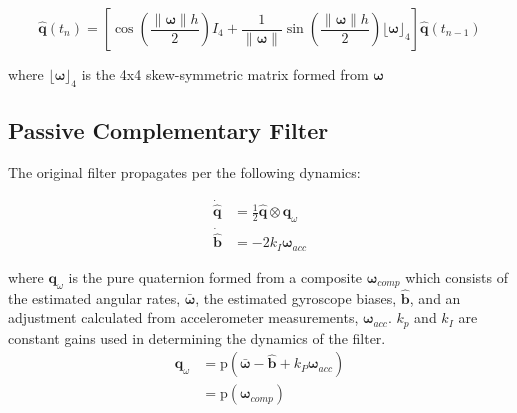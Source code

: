 \documentclass[paper=a4, fontsize=11pt]{scrartcl} %
\numberwithin{equation}{section} %
\numberwithin{figure}{section} %
\numberwithin{table}{section} %
\begin{document}
\newcommand{\norm}[1]{\left\lVert#1\right\rVert}
\newcommand{\wbar}{\bm{\bar{\omega}}}
\newcommand{\w}{\bm{\omega}}
\newcommand{\qhat}{\hat{\bm{q}}}
\begin{equation}
	\qhat(t_n) = \left[ \cos \left( \frac{\norm{\w}h}{2}\right)I_4  + \frac{1}{\norm{\w}} \sin \left( \frac{\norm{\w}h}{2} \right) \lfloor\w\rfloor_4   \right] \qhat(t_{n-1})
	\label{eq:mat_exponential}
\end{equation}

where $\lfloor\w\rfloor_4$ is the 4x4 skew-symmetric matrix formed from $\w$

\subsection{Passive Complementary Filter}
The original filter propagates per the following dynamics:

\newcommand{\wacc}{\bm{\omega}_{acc}}
\begin{equation}
	\begin{aligned}
	\bm{\dot{\hat{q}}} &= \frac{1}{2} \bm{\hat{q}} \otimes \bm{q}_{\omega}\\
	\bm{\dot{\hat{b}}} &= -2k_I\wacc
	\end{aligned}
	\label{eq:traditional_prop}
\end{equation}


where $\bm{q}_{\omega}$ is the pure quaternion formed from a composite $\bm{\omega}_{comp}$ which consists of the estimated angular rates, $\bar{\bm{\omega}}$, the estimated gyroscope biases, $\hat{\bm{b}}$, and an adjustment calculated from accelerometer measurements, $\bm{\omega}_{acc}$. $k_p$ and $k_I$ are constant gains used in determining the dynamics of the filter.
\begin{equation}
\begin{aligned}
	\bm{q}_{\omega} &= \textrm{p}\left(\bar{\bm{\omega}} - \hat{\bm{b}} + k_P\wacc\right) \\
	&= \textrm{p}\left( \bm{\omega}_{comp} \right) 
	\label{eq:q_omega}
\end{aligned}
\end{equation}

\newcommand{\avec}{\bm{a}}
\newcommand{\gvec}{\bm{g}}
\newcommand{\qmeas}{\bm{q}_{acc}}
\newcommand{\gamvec}{\bm{\gamma}}
\end{document}

